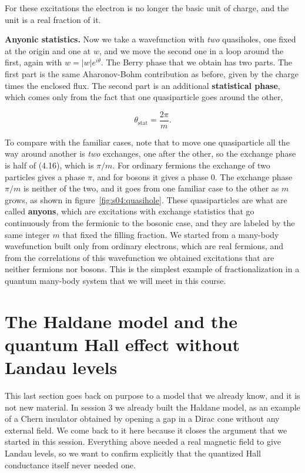For these excitations the electron is no longer the basic unit of charge, and the unit is a real
fraction of it.

\textbf{Anyonic statistics.} Now we take a wavefunction with \emph{two} quasiholes, one fixed at
the origin and one at $w$, and we move the second one in a loop around the first, again with
$w=|w|e^{i\theta}$. The Berry phase that we obtain has two parts. The first part is the same
Aharonov-Bohm contribution as before, given by the charge times the enclosed flux. The second part
is an additional \textbf{statistical phase}, which comes only from the fact that one quasiparticle
goes around the other,

\begin{equation}
\theta_{\text{stat}} = \frac{2\pi}{m}.
\end{equation}

To compare with the familiar cases, note that to move one
quasiparticle all the way around another is \emph{two} exchanges, one after the other, so the
exchange phase is half of (4.16), which is $\pi/m$. For ordinary fermions the exchange of two
particles gives a phase $\pi$, and for bosons it gives a phase $0$. The exchange phase $\pi/m$ is
neither of the two, and it goes from one familiar case to the other as $m$ grows, as shown in
figure~\ref{fig:s04:quasihole}. These quasiparticles are what are called \textbf{anyons}, which
are excitations with exchange statistics that go continuously from the fermionic to the bosonic
case, and they are labeled by the same integer $m$ that fixed the filling fraction. We started from
a many-body wavefunction built only from ordinary electrons, which are real fermions, and from the
correlations of this wavefunction we obtained excitations that are neither fermions nor bosons.
This is the simplest example of fractionalization in a quantum many-body system that we will meet
in this course.



\section{The Haldane model and the quantum Hall effect without Landau levels}

This last section goes back on purpose to a model that we already know, and it is not new
material. In session 3 we already built the Haldane model, as an example of a Chern insulator
obtained by opening a gap in a Dirac cone without any external field. We come back to it here
because it closes the argument that we started in this session. Everything above needed a real
magnetic field to give Landau levels, so we want to confirm explicitly that the quantized Hall
conductance itself never needed one.

